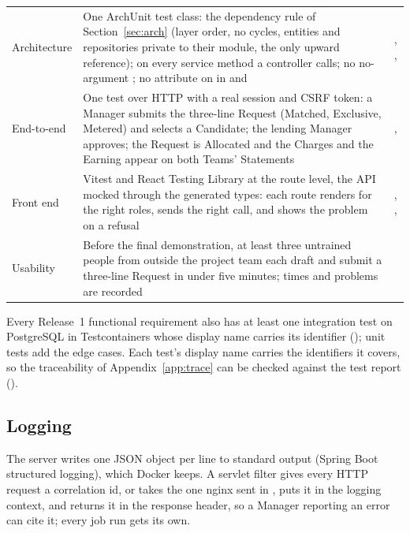{\begin{longtable}{@{}L{0.13\textwidth}L{0.58\textwidth}L{\tabcolsep\relax}@{}}
Architecture & One ArchUnit test class: the dependency rule of Section~\ref{sec:arch} (layer order, no cycles, entities and repositories private to their module,  the only upward reference);  on every service method a controller calls; no no-argument ; no  attribute on  in  and  & , ,  \\
End-to-end & One test over HTTP with a real session and CSRF token: a Manager submits the three-line Request (Matched, Exclusive, Metered) and selects a Candidate; the lending Manager approves; the Request is Allocated and the Charges and the Earning appear on both Teams' Statements & ,  \\
Front end & Vitest and React Testing Library at the route level, the API mocked through the generated types: each route renders for the right roles, sends the right call, and shows the problem  on a refusal & , ,  \\
Usability & Before the final demonstration, at least three untrained people from outside the project team each draft and submit a three-line Request in under five minutes; times and problems are recorded &  \\
\end{longtable}
}

Every Release~1 functional requirement also has at least one integration test on PostgreSQL in Testcontainers whose display name carries its identifier (); unit tests add the edge cases. Each test's display name carries the identifiers it covers, so the traceability of Appendix~\ref{app:trace} can be checked against the test report ().

\subsection{Logging}

The server writes one JSON object per line to standard output (Spring Boot structured logging), which Docker keeps. A servlet filter gives every HTTP request a correlation id, or takes the one nginx sent in , puts it in the logging context, and returns it in the  response header, so a Manager reporting an error can cite it; every job run gets its own.

